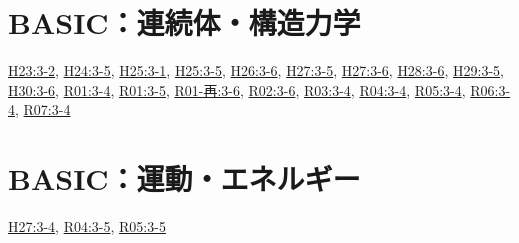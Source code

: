 \section{BASIC：連続体・構造力学}
\hyperref[q:h23-reg-basic-3-2]{H23:3-2}, \hyperref[q:h24-reg-basic-3-5]{H24:3-5}, \hyperref[q:h25-reg-basic-3-1]{H25:3-1}, \hyperref[q:h25-reg-basic-3-5]{H25:3-5}, \hyperref[q:h26-reg-basic-3-6]{H26:3-6}, \hyperref[q:h27-reg-basic-3-5]{H27:3-5}, \hyperref[q:h27-reg-basic-3-6]{H27:3-6}, \hyperref[q:h28-reg-basic-3-6]{H28:3-6}, \hyperref[q:h29-reg-basic-3-5]{H29:3-5}, \hyperref[q:h30-reg-basic-3-6]{H30:3-6}, \hyperref[q:r01-reg-basic-3-4]{R01:3-4}, \hyperref[q:r01-reg-basic-3-5]{R01:3-5}, \hyperref[q:r01-ret-basic-3-6]{R01-再:3-6}, \hyperref[q:r02-reg-basic-3-6]{R02:3-6}, \hyperref[q:r03-reg-basic-3-4]{R03:3-4}, \hyperref[q:r04-reg-basic-3-4]{R04:3-4}, \hyperref[q:r05-reg-basic-3-4]{R05:3-4}, \hyperref[q:r06-reg-basic-3-4]{R06:3-4}, \hyperref[q:r07-reg-basic-3-4]{R07:3-4}
\section{BASIC：運動・エネルギー}
\hyperref[q:h27-reg-basic-3-4]{H27:3-4}, \hyperref[q:r04-reg-basic-3-5]{R04:3-5}, \hyperref[q:r05-reg-basic-3-5]{R05:3-5}

